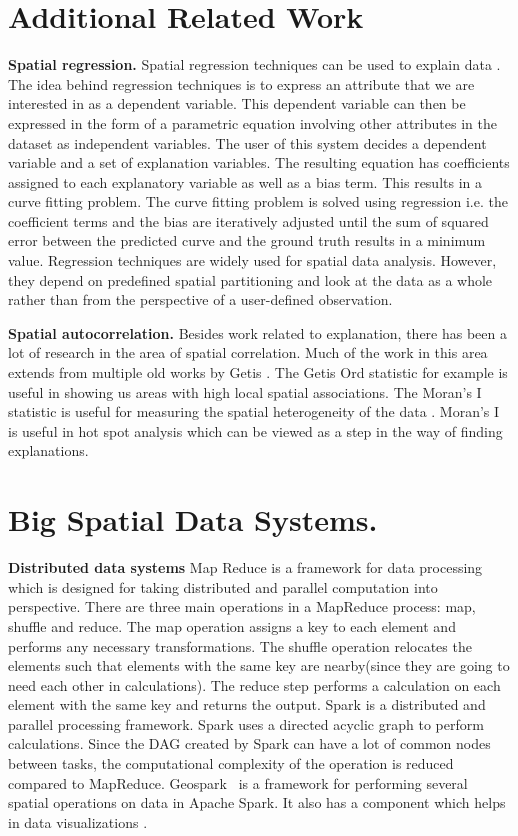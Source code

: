 \appendix
\section{Additional Related Work}
{\bf Spatial regression.} Spatial regression techniques can be used to explain data \cite{dunn1986applied,cleveland1988locally}. The idea behind regression techniques is to express an attribute that we are interested in as a dependent variable. This dependent variable can then be expressed in the form of a parametric equation involving other attributes in the dataset as independent variables. The user of this system decides a dependent variable and a set of explanation variables. The resulting equation has coefficients assigned to each explanatory variable as well as a bias term. This results in a curve fitting problem. The curve fitting problem is solved using regression i.e. the coefficient terms and the bias are iteratively adjusted until the sum of squared error between the predicted curve and the ground truth results in a minimum value. Regression techniques are widely used for spatial data analysis. However, they depend on predefined spatial partitioning and look at the data as a whole rather than from the perspective of a user-defined observation.

{\bf Spatial autocorrelation.} Besides work related to explanation, there has been a lot of research in the area of spatial correlation. Much of the work in this area extends from multiple old works by Getis \cite{getis1991spatial,ord1995local,getis1996local,getis2002comparative,getis2007reflections}. The Getis Ord statistic \cite{ord1995local} for example is useful in showing us areas with high local spatial associations. The Moran's I statistic is useful for measuring the spatial heterogeneity of the data \cite{assuncao1999new,zhang2008use}. Moran's I is useful in hot spot analysis which can be viewed as a step in the way of finding explanations.


\section{Big Spatial Data Systems.}
{\bf Distributed data systems} Map Reduce \cite{dean2008mapreduce} is a framework for data processing which is designed for taking distributed and parallel computation into perspective. There are three main operations in a MapReduce process: map, shuffle and reduce. The map operation assigns a key to each element and performs any necessary transformations. The shuffle operation relocates the elements such that elements with the same key are nearby(since they are going to need each other in calculations). The reduce step performs a calculation on each element with the same key and returns the output. Spark \cite{shanahan2015large,zaharia2016apache} is a distributed and parallel processing framework. Spark uses a directed acyclic graph to perform calculations. Since the DAG created by Spark can have a lot of common nodes between tasks, the computational complexity of the operation is reduced compared to MapReduce.
Geospark~ \cite{yu2015geospark} is a framework for performing several spatial operations on data in Apache Spark. It also has a component which helps in data visualizations \cite{yu2018src}.